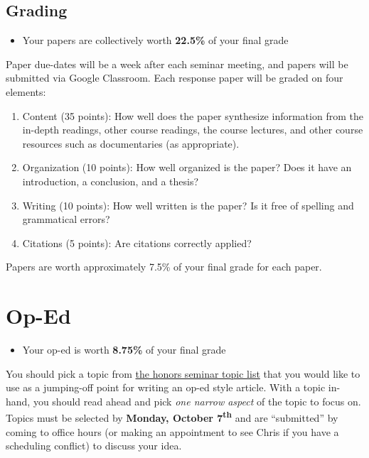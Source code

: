\documentclass[]{book}
\providecommand{\tightlist}{%
  \setlength{\itemsep}{0pt}\setlength{\parskip}{0pt}}
\newenvironment{rmdblock}[1]
  {\begin{shaded*}
  \begin{itemize}
  \renewcommand{\labelitemi}{
    \raisebox{-.7\height}[0pt][0pt]{
      {\setkeys{Gin}{width=3em,keepaspectratio}\texttt{[image: images/\#1]}}
    }
  }
  \item
  }
  {
  \end{itemize}
  \end{shaded*}
  }
\newenvironment{rmdtip}
  {\begin{rmdblock}{tip}}
  {\end{rmdblock}}
\begin{document}
\hypertarget{grading-1}{%
\subsection{Grading}\label{grading-1}}

\begin{rmdtip}
Your papers are collectively worth \textbf{22.5\%} of your final grade
\end{rmdtip}

Paper due-dates will be a week after each seminar meeting, and papers will be submitted via Google Classroom. Each response paper will be graded on four elements:

\begin{enumerate}
\def\labelenumi{\arabic{enumi}.}
\tightlist
\item
  Content (35 points): How well does the paper synthesize information from the in-depth readings, other course readings, the course lectures, and other course resources such as documentaries (as appropriate).
\item
  Organization (10 points): How well organized is the paper? Does it have an introduction, a conclusion, and a thesis?
\item
  Writing (10 points): How well written is the paper? Is it free of spelling and grammatical errors?
\item
  Citations (5 points): Are citations correctly applied?
\end{enumerate}

Papers are worth approximately 7.5\% of your final grade for each paper.

\hypertarget{op-ed}{%
\section{Op-Ed}\label{op-ed}}

\begin{rmdtip}
Your op-ed is worth \textbf{8.75\%} of your final grade
\end{rmdtip}

You should pick a topic from \href{/honors-seminar-topics.html}{the honors seminar topic list} that you would like to use as a jumping-off point for writing an op-ed style article. With a topic in-hand, you should read ahead and pick \emph{one narrow aspect} of the topic to focus on. Topics must be selected by \textbf{Monday, October 7\textsuperscript{th}} and are ``submitted'' by coming to office hours (or making an appointment to see Chris if you have a scheduling conflict) to discuss your idea.
\end{document}
